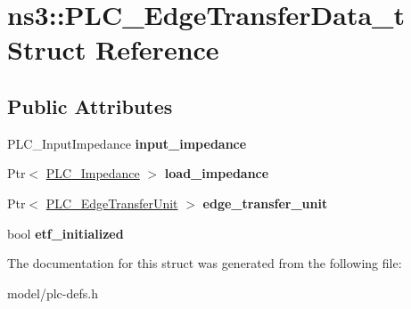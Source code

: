 \hypertarget{structns3_1_1PLC__EdgeTransferData__t}{\section{ns3\-:\-:\-P\-L\-C\-\_\-\-Edge\-Transfer\-Data\-\_\-t \-Struct \-Reference}
\label{structns3_1_1PLC__EdgeTransferData__t}
}
\subsection*{\-Public \-Attributes}
\begin{DoxyCompactItemize}
\item 
\hypertarget{structns3_1_1PLC__EdgeTransferData__t_a5220b323aa355fa61c36e024c68a0312}{\-P\-L\-C\-\_\-\-Input\-Impedance {\bfseries input\-\_\-impedance}}\label{structns3_1_1PLC__EdgeTransferData__t_a5220b323aa355fa61c36e024c68a0312}

\item 
\hypertarget{structns3_1_1PLC__EdgeTransferData__t_adca030f2a70e3f5df97857d940c420e2}{\-Ptr$<$ \hyperlink{classns3_1_1PLC__ValueBase}{\-P\-L\-C\-\_\-\-Impedance} $>$ {\bfseries load\-\_\-impedance}}\label{structns3_1_1PLC__EdgeTransferData__t_adca030f2a70e3f5df97857d940c420e2}

\item 
\hypertarget{structns3_1_1PLC__EdgeTransferData__t_ade37b1cd647ade8e19c56a48f45e651f}{\-Ptr$<$ \hyperlink{classns3_1_1PLC__EdgeTransferUnit}{\-P\-L\-C\-\_\-\-Edge\-Transfer\-Unit} $>$ {\bfseries edge\-\_\-transfer\-\_\-unit}}\label{structns3_1_1PLC__EdgeTransferData__t_ade37b1cd647ade8e19c56a48f45e651f}

\item 
\hypertarget{structns3_1_1PLC__EdgeTransferData__t_a9d746651e8c2a8ef5b85fc6e7d2d0bca}{bool {\bfseries etf\-\_\-initialized}}\label{structns3_1_1PLC__EdgeTransferData__t_a9d746651e8c2a8ef5b85fc6e7d2d0bca}

\end{DoxyCompactItemize}


\-The documentation for this struct was generated from the following file\-:\begin{DoxyCompactItemize}
\item 
model/plc-\/defs.\-h\end{DoxyCompactItemize}
